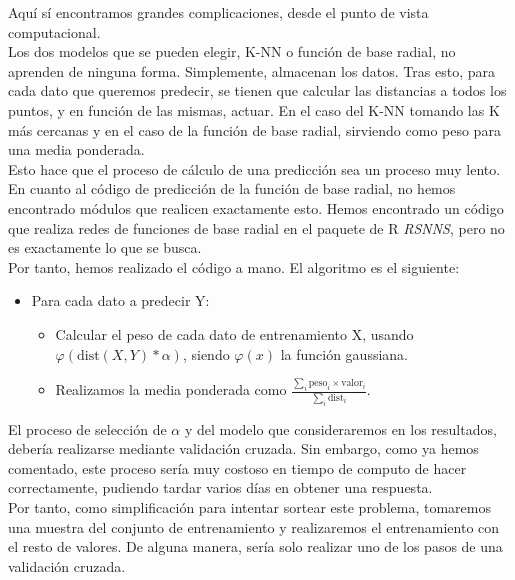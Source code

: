 Aquí sí encontramos grandes complicaciones, desde el punto de vista computacional.\\

Los dos modelos que se pueden elegir, K-NN o función de base radial, no aprenden de ninguna forma. Simplemente, almacenan los datos. Tras esto, para cada dato que queremos predecir, se tienen que calcular las distancias a todos los puntos, y en función de las mismas, actuar. En el caso del K-NN tomando las K más cercanas y en el caso de la función de base radial, sirviendo como peso para una media ponderada.\\

Esto hace que el proceso de cálculo de una predicción sea un proceso muy lento.\\

En cuanto al código de predicción de la función de base radial, no hemos encontrado módulos que realicen exactamente esto. Hemos encontrado un código que realiza redes de funciones de base radial en el paquete de R \textit{RSNNS}, pero no es exactamente lo que se busca.\\

Por tanto, hemos realizado el código a mano. El algoritmo es el siguiente:
\begin{itemize}
\item Para cada dato a predecir Y:
\begin{itemize}
\item Calcular el peso de cada dato de entrenamiento X, usando\\ $\varphi(\textrm{dist}(X,Y)*\alpha)$, siendo $\varphi(x)$ la función gaussiana.
\item Realizamos la media ponderada como $\frac{\sum_i \textrm{peso}_i \times \textrm{valor}_i }{\sum_i \textrm{dist}_i}$.
\end{itemize}
\end{itemize}

El proceso de selección de $\alpha$ y del modelo que consideraremos en los resultados, debería realizarse mediante validación cruzada. Sin embargo, como ya hemos comentado, este proceso sería muy costoso en tiempo de computo de hacer correctamente, pudiendo tardar varios días en obtener una respuesta.\\

Por tanto, como simplificación para intentar sortear este problema, tomaremos una muestra del conjunto de entrenamiento y realizaremos el entrenamiento con el resto de valores. De alguna manera, sería solo realizar uno de los pasos de una validación cruzada.\\


